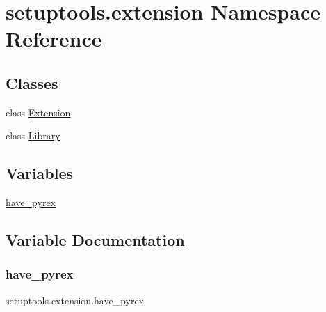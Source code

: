 \hypertarget{namespacesetuptools_1_1extension}{}\section{setuptools.\+extension Namespace Reference}
\label{namespacesetuptools_1_1extension}
\subsection*{Classes}
\begin{DoxyCompactItemize}
\item 
class \hyperlink{classsetuptools_1_1extension_1_1_extension}{Extension}
\item 
class \hyperlink{classsetuptools_1_1extension_1_1_library}{Library}
\end{DoxyCompactItemize}
\subsection*{Variables}
\begin{DoxyCompactItemize}
\item 
\hyperlink{namespacesetuptools_1_1extension_a50aa9312d90ca37835ca48bd6a0110e2}{have\+\_\+pyrex}
\end{DoxyCompactItemize}


\subsection{Variable Documentation}
\mbox{\label{namespacesetuptools_1_1extension_a50aa9312d90ca37835ca48bd6a0110e2}} 
\subsubsection{\texorpdfstring{have\+\_\+pyrex}{have\_pyrex}}
{\footnotesize\ttfamily setuptools.\+extension.\+have\+\_\+pyrex}


